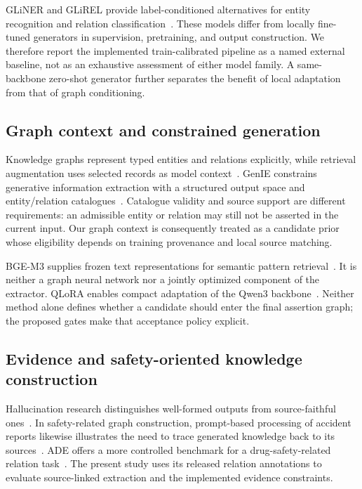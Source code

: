\documentclass[preprint,12pt]{elsarticle}
\begin{document}
GLiNER and GLiREL provide label-conditioned alternatives for entity recognition
and relation classification~\cite{zaratiana2024gliner,boylan2025glirel}.
These models differ from locally fine-tuned generators in supervision,
pretraining, and output construction. We therefore report the implemented
train-calibrated pipeline as a named external baseline, not as an exhaustive
assessment of either model family. A same-backbone zero-shot generator further
separates the benefit of local adaptation from that of graph conditioning.

\subsection{Graph context and constrained generation}
Knowledge graphs represent typed entities and relations explicitly, while
retrieval augmentation uses selected records as model
context~\cite{hogan2021kg,lewis2020rag}. GenIE constrains generative information
extraction with a structured output space and entity/relation
catalogues~\cite{josifoski2022genie}. Catalogue validity and source support are
different requirements: an admissible entity or relation may still not be
asserted in the current input. Our graph context is consequently treated as a
candidate prior whose eligibility depends on training provenance and local
source matching.

BGE-M3 supplies frozen text representations for semantic pattern
retrieval~\cite{chen2024bgem3}. It is neither a graph neural network nor a
jointly optimized component of the extractor. QLoRA enables compact adaptation
of the Qwen3 backbone~\cite{dettmers2023qlora,qwen2025qwen3}. Neither method
alone defines whether a candidate should enter the final assertion graph; the
proposed gates make that acceptance policy explicit.

\subsection{Evidence and safety-oriented knowledge construction}
Hallucination research distinguishes well-formed outputs from source-faithful
ones~\cite{ji2023hallucination}. In safety-related graph construction,
prompt-based processing of accident reports likewise illustrates the need to
trace generated knowledge back to its sources~\cite{liu2025llmaccidentkg}.
ADE offers a more controlled benchmark for a drug-safety-related relation
task~\cite{gurulingappa2012ade}. The present study uses its released relation
annotations to evaluate source-linked extraction and the implemented evidence
constraints.
\end{document}
